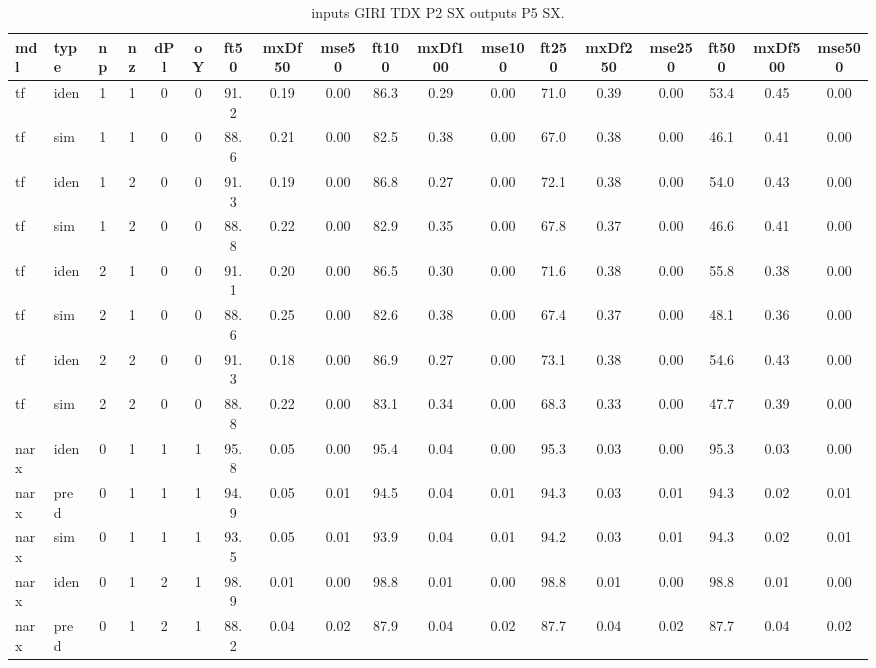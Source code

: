 \begin{landscape} 
 \begin{center} 
\begin{longtable}{ll|cccc|ccc|ccc|ccc|ccc} 
\caption[inputs GIRI TDX P2 SX   outputs P5 SX]{inputs GIRI TDX P2 SX   outputs P5 SX.} 
\label{tab:inputs_GIRI_TDX_P2_SX___outputs_P5_SX} 
\hline 
  mdl & type & np & nz & dPl & oY & ft50 & mxDf50 & mse50 & ft100 & mxDf100 & mse100 & ft250 & mxDf250 & mse250 & ft500 & mxDf500 & mse500 \\ 
 \hline 
tf  & iden & 1 & 1 & 0 & 0 & 91.2 & 0.19 & 0.00 & 86.3 & 0.29 & 0.00 & 71.0 & 0.39 & 0.00 & 53.4 & 0.45 & 0.00 \\ 
tf  & sim  & 1 & 1 & 0 & 0 & 88.6 & 0.21 & 0.00 & 82.5 & 0.38 & 0.00 & 67.0 & 0.38 & 0.00 & 46.1 & 0.41 & 0.00 \\ 
 \hline 
tf  & iden & 1 & 2 & 0 & 0 & 91.3 & 0.19 & 0.00 & 86.8 & 0.27 & 0.00 & 72.1 & 0.38 & 0.00 & 54.0 & 0.43 & 0.00 \\ 
tf  & sim  & 1 & 2 & 0 & 0 & 88.8 & 0.22 & 0.00 & 82.9 & 0.35 & 0.00 & 67.8 & 0.37 & 0.00 & 46.6 & 0.41 & 0.00 \\ 
 \hline 
tf  & iden & 2 & 1 & 0 & 0 & 91.1 & 0.20 & 0.00 & 86.5 & 0.30 & 0.00 & 71.6 & 0.38 & 0.00 & 55.8 & 0.38 & 0.00 \\ 
tf  & sim  & 2 & 1 & 0 & 0 & 88.6 & 0.25 & 0.00 & 82.6 & 0.38 & 0.00 & 67.4 & 0.37 & 0.00 & 48.1 & 0.36 & 0.00 \\ 
 \hline 
tf  & iden & 2 & 2 & 0 & 0 & 91.3 & 0.18 & 0.00 & 86.9 & 0.27 & 0.00 & 73.1 & 0.38 & 0.00 & 54.6 & 0.43 & 0.00 \\ 
tf  & sim  & 2 & 2 & 0 & 0 & 88.8 & 0.22 & 0.00 & 83.1 & 0.34 & 0.00 & 68.3 & 0.33 & 0.00 & 47.7 & 0.39 & 0.00 \\ 
 \hline 
narx & iden & 0 & 1 & 1 & 1 & 95.8 & 0.05 & 0.00 & 95.4 & 0.04 & 0.00 & 95.3 & 0.03 & 0.00 & 95.3 & 0.03 & 0.00 \\ 
narx & pred & 0 & 1 & 1 & 1 & 94.9 & 0.05 & 0.01 & 94.5 & 0.04 & 0.01 & 94.3 & 0.03 & 0.01 & 94.3 & 0.02 & 0.01 \\ 
narx & sim  & 0 & 1 & 1 & 1 & 93.5 & 0.05 & 0.01 & 93.9 & 0.04 & 0.01 & 94.2 & 0.03 & 0.01 & 94.3 & 0.02 & 0.01 \\ 
 \hline 
narx & iden & 0 & 1 & 2 & 1 & 98.9 & 0.01 & 0.00 & 98.8 & 0.01 & 0.00 & 98.8 & 0.01 & 0.00 & 98.8 & 0.01 & 0.00 \\ 
narx & pred & 0 & 1 & 2 & 1 & 88.2 & 0.04 & 0.02 & 87.9 & 0.04 & 0.02 & 87.7 & 0.04 & 0.02 & 87.7 & 0.04 & 0.02 \\ 

\end{longtable}
\end{center}
\end{landscape}
